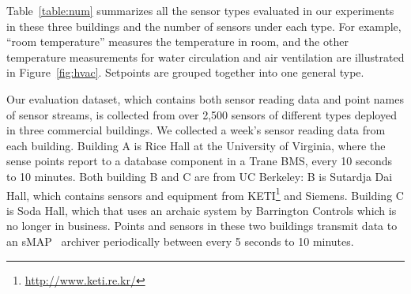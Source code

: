 Table~\ref{table:num} summarizes all the sensor types evaluated in our experiments in these three buildings and the number of sensors under each type. For example, ``room temperature'' measures the temperature in room, and the other temperature measurements for water circulation and air ventilation are illustrated in Figure~\ref{fig:hvac}.
Setpoints are grouped together into
one general type. %

Our evaluation dataset, which contains both sensor reading data and point names of sensor streams, is collected from over 2,500 sensors of different types deployed in three commercial buildings.
We collected a week's sensor reading data from each building.
Building A is Rice Hall at the University of Virginia, where the sense points report to a database component in a Trane BMS, %
every 10 seconds to 10 minutes.
Both building B and C are from UC Berkeley: B is Sutardja Dai Hall, which contains sensors and equipment from KETI\footnote{\url{http://www.keti.re.kr/}} and Siemens.
Building C is Soda Hall, which that uses an archaic system by Barrington Controls which is no longer in business.
Points and sensors in these two buildings transmit data to an sMAP~\cite{smap} archiver periodically between every 5 seconds to 10 minutes.


